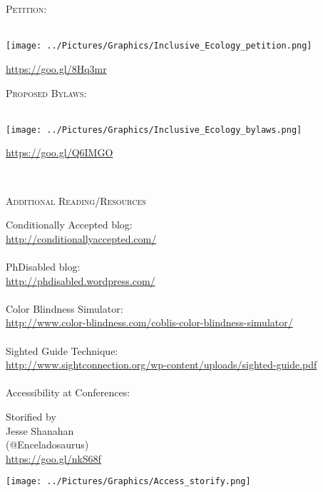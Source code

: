 \documentclass{beamer}
\begin{document}
\begin{center}
\begin{minipage}{0.25\linewidth}
~\\
~\\
\begin{minipage}{0.49\textwidth}
\textsc{Petition:}\\
~\\
\begin{minipage}{0.49\textwidth}
\texttt{[image: ../Pictures/Graphics/Inclusive\_Ecology\_petition.png]}\\ 
\end{minipage}
\begin{minipage}{0.49\textwidth}
\url{https://goo.gl/8Hq3mr}\\
\end{minipage}
\end{minipage}
\begin{minipage}{0.49\textwidth}
\textsc{Proposed Bylaws:}\\
~\\
\begin{minipage}{0.49\textwidth}
\texttt{[image: ../Pictures/Graphics/Inclusive\_Ecology\_bylaws.png]}\\
\end{minipage}
\begin{minipage}{0.49\textwidth} 
\url{https://goo.gl/Q6IMGO}\\
\end{minipage}
\end{minipage}
~\\
\begin{Large}
\textsc{Additional Reading/Resources}\\
\end{Large}
Conditionally Accepted blog:\\
\url{http://conditionallyaccepted.com/}\\
~\\
PhDisabled blog:\\
\url{http://phdisabled.wordpress.com/}\\
~\\
Color Blindness Simulator:\\
\url{http://www.color-blindness.com/coblis-color-blindness-simulator/}\\
~\\
Sighted Guide Technique:\\
\url{http://www.sightconnection.org/wp-content/uploads/sighted-guide.pdf}\\
~\\
Accessibility at Conferences:\\
\begin{minipage}{0.67\textwidth}
Storified by\\
Jesse Shanahan\\
(@Enceladosaurus)\\
\url{https://goo.gl/nkS68f}\\
\end{minipage}
\begin{minipage}{0.3\textwidth}
\texttt{[image: ../Pictures/Graphics/Access\_storify.png]}
\end{minipage}
\\ 
\end{minipage}
\end{center}
\end{document}

